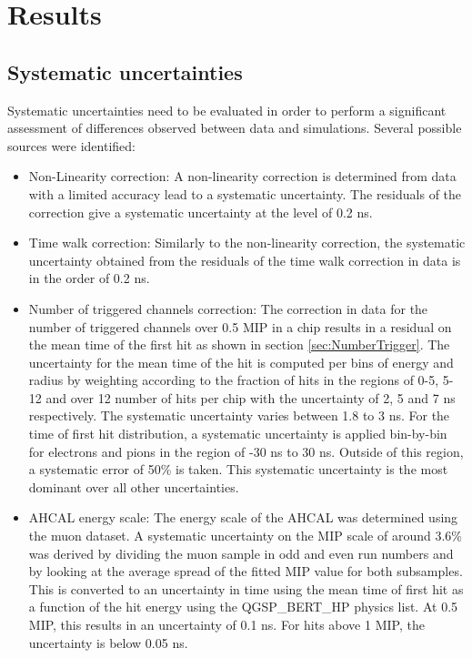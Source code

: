 \documentclass{JINST}
\begin{document}
\section{Results}

\subsection{Systematic uncertainties}

Systematic uncertainties need to be evaluated in order to perform a significant assessment of differences observed between data and simulations. Several possible sources were identified:

\begin{itemize}
  \item Non-Linearity correction: A non-linearity correction is determined from data with a limited accuracy lead to a systematic uncertainty. The residuals of the correction give a systematic uncertainty at the level of 0.2 ns.
  \item Time walk correction: Similarly to the non-linearity correction, the systematic uncertainty obtained from the residuals of the time walk correction in data is in the order of 0.2 ns.
  \item Number of triggered channels correction: The correction in data for the number of triggered channels over 0.5 MIP in a chip results in a residual on the mean time of the first hit as shown in section \ref{sec:NumberTrigger}. The uncertainty for the mean time of the hit is computed per bins of energy and radius by weighting according to the fraction of hits in the regions of 0-5, 5-12 and over 12 number of hits per chip with the uncertainty of 2, 5 and 7 ns respectively. The systematic uncertainty varies between 1.8 to 3 ns. For the time of first hit distribution, a systematic uncertainty is applied bin-by-bin for electrons and pions in the region of -30 ns to 30 ns. Outside of this region, a systematic error of 50\% is taken. This systematic uncertainty is the most dominant over all other uncertainties.
  \item AHCAL energy scale: The energy scale of the AHCAL was determined using the muon dataset. A systematic uncertainty on the MIP scale of around 3.6\% was derived by dividing the muon sample in odd and even run numbers and by looking at the average spread of the fitted MIP value for both subsamples. This is converted to an uncertainty in time using the mean time of first hit as a function of the hit energy using the QGSP\_BERT\_HP physics list. At 0.5 MIP, this results in an uncertainty of 0.1 ns. For hits above 1 MIP, the uncertainty is below 0.05 ns.

\end{itemize}
\end{document}
